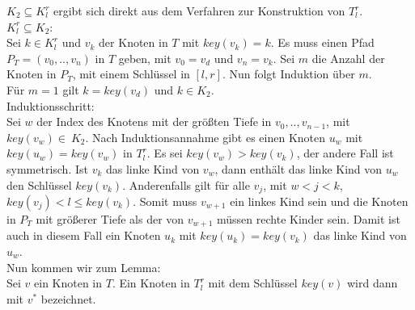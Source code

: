 \documentclass[a4paper,12pt]{article}
\begin{document}
\noindent $K_2 \subseteq  K^r_l$ ergibt sich direkt aus dem Verfahren zur Konstruktion von $T^r_l$.\\

\noindent $ K^r_l \subseteq K_2$:\\
Sei $k \in K^r_l$ und $v_k$ der Knoten in $T$ mit $\mathit{key}(v_k) = k$. Es muss einen Pfad $P_T = \left(v_0,..,v_n\right)$ in $T$ geben, mit $v_0 = v_d$ und $v_n = v_k$. Sei $m$ die Anzahl der Knoten in $P_T$, mit einem Schlüssel in  $\left[l,r\right]$. Nun folgt Induktion über $m$.\\
Für $m = 1$ gilt $k = \mathit{key}\left(v_d\right)$  und $k \in K_2$. \\
Induktionsschritt:\\
Sei $w$ der Index des Knotens mit der größten Tiefe in $ v_0,..,v_{n-1}$, mit\\ $\mathit{key}(v_w) \in~K_2$. Nach Induktionsannahme gibt es einen Knoten $u_w$ mit $\mathit{key}(u_w) = \mathit{key}(v_w)$ in $T^r_l$.  Es sei $\mathit{key}(v_w) > \mathit{key}(v_k)$, der andere Fall ist symmetrisch. Ist $v_k$ das linke Kind von $v_w$, dann enthält das linke Kind von $u_w$ den Schlüssel $\mathit{key}(v_k)$. Anderenfalls gilt für alle $v_j$, mit $w < j < k$, $\mathit{key}(v_j) < l \leq \mathit{key}(v_k)$. Somit muss $v_{w+1}$ ein linkes Kind sein und die Knoten in $P_T$ mit größerer Tiefe als der von $v_{w+1}$ müssen rechte Kinder sein. Damit ist auch in diesem Fall ein Knoten $u_k$ mit $\mathit{key}(u_k) = \mathit{key}(v_k)$ das linke Kind von $u_w$.  \\

\noindent Nun kommen wir zum Lemma:\\






\noindent Sei $v$ ein Knoten in $T$. Ein Knoten in $T^r_l$ mit dem Schlüssel $\mathit{key}(v)$ wird dann mit $v^*$ bezeichnet.  
\end{document}
